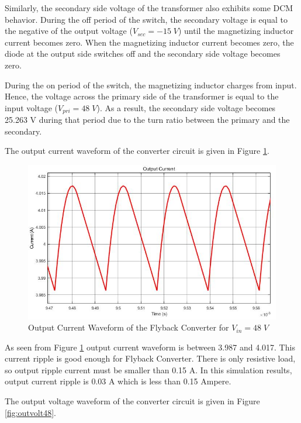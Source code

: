 Similarly, the secondary side voltage of the transformer also exhibits some DCM behavior. During the off period of the switch, the secondary voltage is equal to the negative of the output voltage ($ V_{sec} = -15\;V $) until the magnetizing inductor current becomes zero. When the magnetizing inductor current becomes zero, the diode at the output side switches off and the secondary side voltage becomes zero.

During the on period of the switch, the magnetizing inductor charges from input. Hence, the voltage across the primary side of the transformer is equal to the input voltage ($V_{pri} = 48\;V $). As a result, the secondary side voltage becomes 25.263 V during that period due to the turn ratio between the primary and the secondary.


The output current waveform of the converter circuit is given in Figure \ref{fig:outcurr48}.

\begin{figure}[H]
\begin{center}
\includegraphics[width=1\textwidth]{output_current_48.jpg}
\caption{Output Current Waveform of the Flyback Converter for $ V_{in} = 48\;V $}
\label{fig:outcurr48}
\end{center}
\end{figure}

As seen from Figure \ref{fig:outcurr48} output current waveform is between 3.987 and 4.017. This current ripple is good enough for Flyback Converter. There is only resistive load, so output ripple current must be smaller than 0.15 A. In this simulation results, output current ripple is 0.03 A which is less than 0.15 Ampere.

The output voltage waveform of the converter circuit is given in Figure \ref{fig:outvolt48}.


